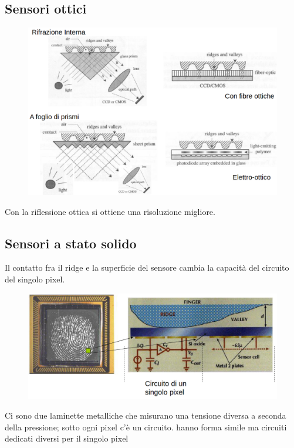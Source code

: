 \subsection{Sensori ottici}

\begin{figure}[ht]
    \centering
    \includegraphics[width=1\linewidth]{images-chap5/ottici.png}
\end{figure}

Con la riflessione ottica si ottiene una risoluzione migliore.

\subsection{Sensori a stato solido}

Il contatto fra il ridge e la superficie del sensore cambia la capacità
del circuito del singolo pixel.

\begin{figure}[ht]
    \centering
    \includegraphics[width=1\linewidth]{images-chap5/statosolido.png}
\end{figure}

Ci sono due laminette metalliche che misurano una tensione diversa a seconda
della pressione; sotto ogni pixel c'è un circuito.
hanno forma simile ma circuiti dedicati diversi per il singolo pixel

